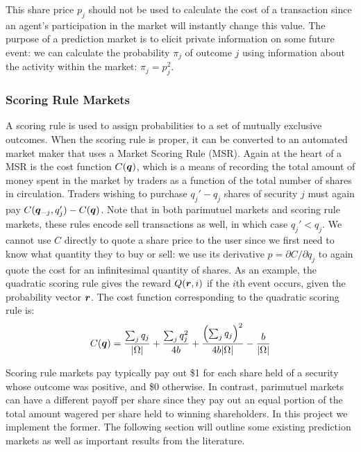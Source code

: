 This share price $p_j$ should not be used to calculate the cost of a
transaction since an agent's participation in the market will instantly change
this value. The purpose of a prediction market is to elicit private information
on some future event: we can calculate the probability $\pi_j$ of outcome $j$ using
information about the activity within the market: $\pi_j = p_j^2$.

\subsubsection{Scoring Rule Markets}

A scoring rule is used to assign probabilities to a set of mutually exclusive
outcomes. When the scoring rule is proper, it can be converted to an automated
market maker that uses a Market Scoring Rule (MSR). Again at the heart of a MSR
is the cost function $C(\bm{q})$, which is a means of recording the total
amount of money spent in the market by traders as a function of the total
number of shares in circulation. Traders wishing to purchase $q_j' - q_j$
shares of security $j$ must again pay $C(\bm{q}_{-j}, q_j')-C(\bm{q})$.
Note that in both parimutuel markets and scoring rule markets, these
rules encode sell transactions as well, in which case $q_j' < q_j$. We cannot
use $C$ directly to quote a share price to the user since we first need to know
what quantity they to buy or sell: we use its derivative $p = \partial C /
\partial q_j$ to again quote the cost for an infinitesimal quantity of shares. 
As an example, the quadratic scoring rule gives the reward $Q(\bm{r},i)$ if
the $i$th event occurs, given the probability vector $\bm{r}$. The cost
function corresponding to the quadratic scoring rule is:
%
$$
C(\bm{q}) =
\frac{\sum_j q_j}{|\Omega|} + \frac{\sum_j q_j^2}{4b}  +
\frac{\left( \sum_j q_j \right)^2}{4b|\Omega|} - \frac{b}{|\Omega|}
$$

Scoring rule markets pay typically pay out \$1 for each share held of a
security whose outcome was positive, and \$0 otherwise. In contrast, parimutuel
markets can have a different payoff per share since they pay out an equal
portion of the total amount wagered per share held to winning shareholders. In
this project we implement the former. The following section will outline some
existing prediction markets as well as important results from the literature.
